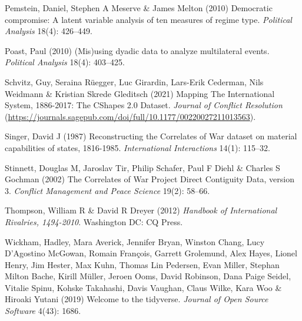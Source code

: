 \documentclass[
  11pt,
]{article}
\newlength{\cslhangindent}
\newenvironment{CSLReferences}[2] %
 {%
  \setlength{\parindent}{0pt}
  \ifodd #1 \everypar{\setlength{\hangindent}{\cslhangindent}}\ignorespaces\fi
  \ifnum #2 > 0
  \setlength{\parskip}{#2\baselineskip}
  \fi
 }%
 {}
\begin{document}
\begin{CSLReferences}{1}{0}
\leavevmode{}%
Pemstein, Daniel, Stephen A Meserve \& James Melton (2010) Democratic compromise: A latent variable analysis of ten measures of regime type. \emph{Political Analysis} 18(4): 426--449.

\leavevmode{}%
Poast, Paul (2010) (Mis)using dyadic data to analyze multilateral events. \emph{Political Analysis} 18(4): 403--425.

\leavevmode{}%
Schvitz, Guy, Seraina Rüegger, Luc Girardin, Lars-Erik Cederman, Nils Weidmann \& Kristian Skrede Gleditsch (2021) {Mapping The International System, 1886-2017: The {CS}hapes 2.0 Dataset}. \emph{Journal of Conflict Resolution} (\url{https://journals.sagepub.com/doi/full/10.1177/00220027211013563}).

\leavevmode{}%
Singer, David J (1987) Reconstructing the {C}orrelates of {W}ar dataset on material capabilities of states, 1816-1985. \emph{International Interactions} 14(1): 115--32.

\leavevmode{}%
Stinnett, Douglas M, Jaroslav Tir, Philip Schafer, Paul F Diehl \& Charles S Gochman (2002) The {C}orrelates of {W}ar {P}roject {D}irect {C}ontiguity {D}ata, version 3. \emph{Conflict Management and Peace Science} 19(2): 58--66.

\leavevmode{}%
Thompson, William R \& David R Dreyer (2012) \emph{Handbook of International Rivalries, 1494-2010}. Washington DC: CQ Press.

\leavevmode{}%
Wickham, Hadley, Mara Averick, Jennifer Bryan, Winston Chang, Lucy D'Agostino McGowan, Romain François, Garrett Grolemund, Alex Hayes, Lionel Henry, Jim Hester, Max Kuhn, Thomas Lin Pedersen, Evan Miller, Stephan Milton Bache, Kirill Müller, Jeroen Ooms, David Robinson, Dana Paige Seidel, Vitalie Spinu, Kohske Takahashi, Davis Vaughan, Claus Wilke, Kara Woo \& Hiroaki Yutani (2019) Welcome to the {tidyverse}. \emph{Journal of Open Source Software} 4(43): 1686.

\end{CSLReferences}
\end{document}
